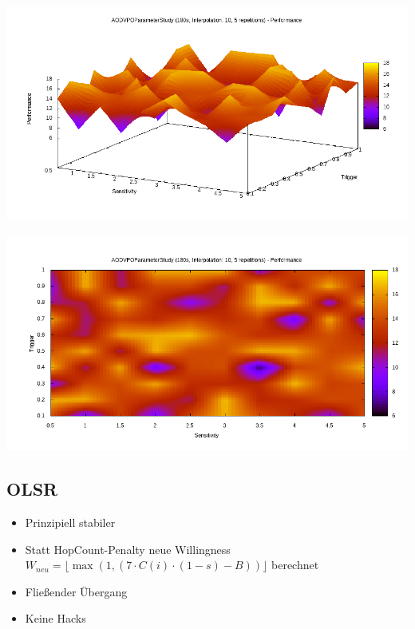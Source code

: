 \documentclass[11pt,landscape]{beamer}
\begin{document}
\begin{frame}{\insertsubsection}
\includegraphics[scale=0.45]{aodvstudyperf}
\end{frame}

\begin{frame}{\insertsubsection}
\includegraphics[scale=0.45]{aodvstudyperfmap}
\end{frame}

\subsection{OLSR}

\begin{frame}{\insertsubsection}
\begin{itemize}
\item Prinzipiell stabiler\newline
\item Statt HopCount-Penalty neue Willingness $W_{neu} = \lfloor\max(1,(7\cdot C(i)\cdot (1-s)-B))\rfloor$ berechnet\newline
\item Fließender Übergang\newline
\item Keine Hacks
\end{itemize}
\end{frame}
\end{document}
